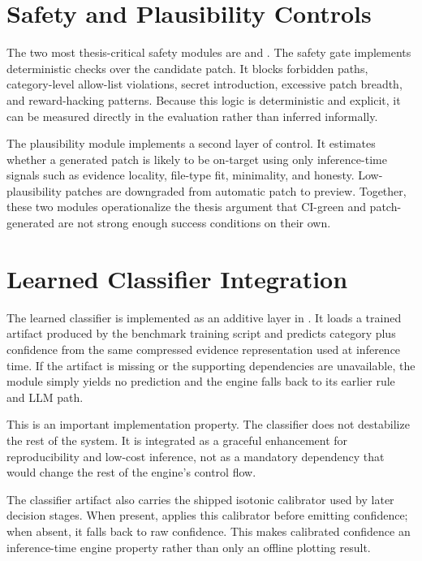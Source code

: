 \section{Safety and Plausibility Controls}

The two most thesis-critical safety modules are  and
. The safety gate implements deterministic checks over the candidate patch. It
blocks forbidden paths, category-level allow-list violations, secret introduction, excessive patch breadth, and
reward-hacking patterns. Because this logic is deterministic and explicit, it can be measured directly in the
evaluation rather than inferred informally.

The plausibility module implements a second layer of control. It estimates whether a generated patch is likely
to be on-target using only inference-time signals such as evidence locality, file-type fit, minimality, and
honesty. Low-plausibility patches are downgraded from automatic patch to preview. Together, these two modules
operationalize the thesis argument that CI-green and patch-generated are not strong enough success conditions on
their own.

\section{Learned Classifier Integration}

The learned classifier is implemented as an additive layer in . It loads a trained
artifact produced by the benchmark training script and predicts category plus confidence from the same compressed
evidence representation used at inference time. If the artifact is missing or the supporting dependencies are
unavailable, the module simply yields no prediction and the engine falls back to its earlier rule and LLM path.

This is an important implementation property. The classifier does not destabilize the rest of the system. It is
integrated as a graceful enhancement for reproducibility and low-cost inference, not as a mandatory dependency
that would change the rest of the engine's control flow.

The classifier artifact also carries the shipped isotonic calibrator used by later decision stages. When present,
 applies this calibrator before emitting confidence; when absent, it falls back to raw
confidence. This makes calibrated confidence an inference-time engine property rather than only an offline
plotting result.

